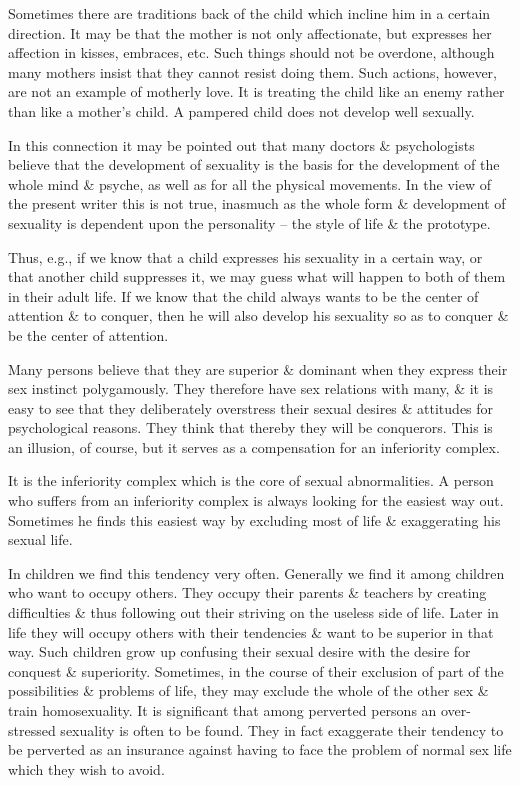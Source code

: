 \documentclass{article}
\begin{document}
Sometimes there are traditions back of the child which incline him in a certain direction. It may be that the mother is not only affectionate, but expresses her affection in kisses, embraces, etc. Such things should not be overdone, although many mothers insist that they cannot resist doing them. Such actions, however, are not an example of motherly love. It is treating the child like an enemy rather than like a mother's child. A pampered child does not develop well sexually.

In this connection it may be pointed out that many doctors \& psychologists believe that the development of sexuality is the basis for the development of the whole mind \& psyche, as well as for all the physical movements. In the view of the present writer this is not true, inasmuch as the whole form \& development of sexuality is dependent upon the personality -- the style of life \& the prototype.

Thus, e.g., if we know that a child expresses his sexuality in a certain way, or that another child suppresses it, we may guess what will happen to both of them in their adult life. If we know that the child always wants to be the center of attention \& to conquer, then he will also develop his sexuality so as to conquer \& be the center of attention.

Many persons believe that they are superior \& dominant when they express their sex instinct polygamously. They therefore have sex relations with many, \& it is easy to see that they deliberately overstress their sexual desires \& attitudes for psychological reasons. They think that thereby they will be conquerors. This is an illusion, of course, but it serves as a compensation for an inferiority complex.

It is the inferiority complex which is the core of sexual abnormalities. A person who suffers from an inferiority complex is always looking for the easiest way out. Sometimes he finds this easiest way by excluding most of life \& exaggerating his sexual life.

In children we find this tendency very often. Generally we find it among children who want to occupy others. They occupy their parents \& teachers by creating difficulties \& thus following out their striving on the useless side of life. Later in life they will occupy others with their tendencies \& want to be superior in that way. Such children grow up confusing their sexual desire with the desire for conquest \& superiority. Sometimes, in the course of their exclusion of part of the possibilities \& problems of life, they may exclude the whole of the other sex \& train homosexuality. It is significant that among perverted persons an over-stressed sexuality is often to be found. They in fact exaggerate their tendency to be perverted as an insurance against having to face the problem of normal sex life which they wish to avoid.
\end{document}
